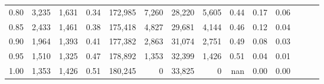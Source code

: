\begin{tabular}{rrrrrrrrrrrrrr}
0.80 &   3,235 &  1,631 &  0.34 &  172,985 &    7,260 &  28,220 &   5,605 &  0.44 &  0.17 &      0.06 \\
0.85 &   2,433 &  1,461 &  0.38 &  175,418 &    4,827 &  29,681 &   4,144 &  0.46 &  0.12 &      0.04 \\
0.90 &   1,964 &  1,393 &  0.41 &  177,382 &    2,863 &  31,074 &   2,751 &  0.49 &  0.08 &      0.03 \\
0.95 &   1,510 &  1,325 &  0.47 &  178,892 &    1,353 &  32,399 &   1,426 &  0.51 &  0.04 &      0.01 \\
1.00 &   1,353 &  1,426 &  0.51 &  180,245 &        0 &  33,825 &       0 &   nan &  0.00 &      0.00 \\
\bottomrule
\end{tabular}
